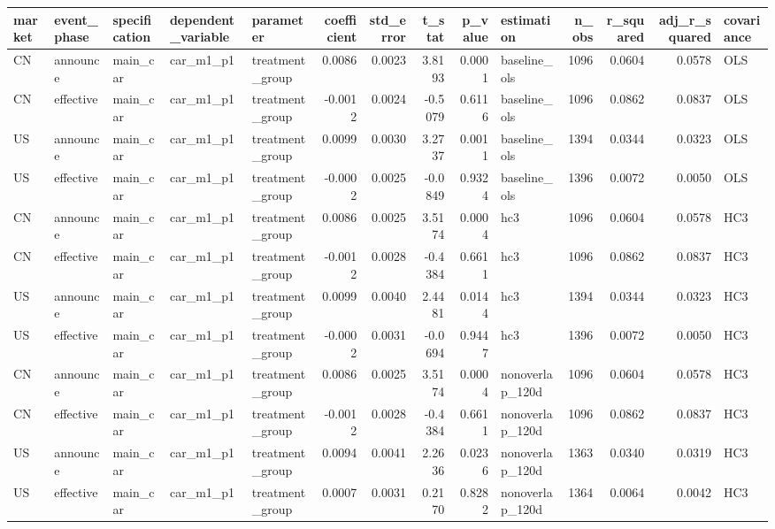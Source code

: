 \begin{tabular}{lllllrrrrlrrrl}
\toprule
market & event_phase & specification & dependent_variable & parameter & coefficient & std_error & t_stat & p_value & estimation & n_obs & r_squared & adj_r_squared & covariance \\
\midrule
CN & announce & main_car & car_m1_p1 & treatment_group & 0.0086 & 0.0023 & 3.8193 & 0.0001 & baseline_ols & 1096 & 0.0604 & 0.0578 & OLS \\
CN & effective & main_car & car_m1_p1 & treatment_group & -0.0012 & 0.0024 & -0.5079 & 0.6116 & baseline_ols & 1096 & 0.0862 & 0.0837 & OLS \\
US & announce & main_car & car_m1_p1 & treatment_group & 0.0099 & 0.0030 & 3.2737 & 0.0011 & baseline_ols & 1394 & 0.0344 & 0.0323 & OLS \\
US & effective & main_car & car_m1_p1 & treatment_group & -0.0002 & 0.0025 & -0.0849 & 0.9324 & baseline_ols & 1396 & 0.0072 & 0.0050 & OLS \\
CN & announce & main_car & car_m1_p1 & treatment_group & 0.0086 & 0.0025 & 3.5174 & 0.0004 & hc3 & 1096 & 0.0604 & 0.0578 & HC3 \\
CN & effective & main_car & car_m1_p1 & treatment_group & -0.0012 & 0.0028 & -0.4384 & 0.6611 & hc3 & 1096 & 0.0862 & 0.0837 & HC3 \\
US & announce & main_car & car_m1_p1 & treatment_group & 0.0099 & 0.0040 & 2.4481 & 0.0144 & hc3 & 1394 & 0.0344 & 0.0323 & HC3 \\
US & effective & main_car & car_m1_p1 & treatment_group & -0.0002 & 0.0031 & -0.0694 & 0.9447 & hc3 & 1396 & 0.0072 & 0.0050 & HC3 \\
CN & announce & main_car & car_m1_p1 & treatment_group & 0.0086 & 0.0025 & 3.5174 & 0.0004 & nonoverlap_120d & 1096 & 0.0604 & 0.0578 & HC3 \\
CN & effective & main_car & car_m1_p1 & treatment_group & -0.0012 & 0.0028 & -0.4384 & 0.6611 & nonoverlap_120d & 1096 & 0.0862 & 0.0837 & HC3 \\
US & announce & main_car & car_m1_p1 & treatment_group & 0.0094 & 0.0041 & 2.2636 & 0.0236 & nonoverlap_120d & 1363 & 0.0340 & 0.0319 & HC3 \\
US & effective & main_car & car_m1_p1 & treatment_group & 0.0007 & 0.0031 & 0.2170 & 0.8282 & nonoverlap_120d & 1364 & 0.0064 & 0.0042 & HC3 \\
\bottomrule
\end{tabular}
